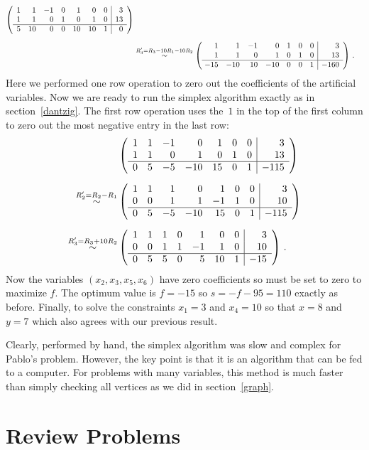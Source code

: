 \begin{example}
\begin{align*}
\left(\begin{array}{rrrrrrr|r}
1&1&-1&0&1&0&0&3\\
1&1&0&1&0&1&0&13\\\hline
5&10&\ 0&0&10&10&1&0
\end{array}\right)\\[2mm]
&\stackrel{\small R_3'=R_3-10 R_1-10R_2 }\sim
\left(\begin{array}{rrrrrrr|r}
1&1&-1&0&1&0&0&3\\
1&1&0&1&0&1&0&13\\\hline
\!-15&-10&\ 10&-10&0&0&1&-160
\end{array}\right)
\, .
\end{align*}
Here we performed one row operation to zero out the coefficients of the artificial variables.
Now we are ready to run the simplex algorithm exactly as in section~\ref{dantzig}. The first row operation 
uses the~$1$ in the top of the first column to zero out the most negative entry in the last row:
\begin{align*}&
\left(\begin{array}{rrrrrrr|r}
1&1&-1&0&1&0&0&3\\
1&1&0&1&0&1&0&13\\\hline
0&5&-5&-10&15&0&1&-115
\end{array}\right)\\[2mm]
\stackrel{\small R_2'=R_2-R_1}\sim&
\left(\begin{array}{rrrrrrr|r}
1&1&1&0&1&0&0&3\\
0&0&1&1&-1&1&0&10\\\hline
0&5&-5&-10&15&0&1&-115
\end{array}\right)\\[2mm]
\stackrel{\small R_3'=R_3+10R_2}\sim&
\left(\begin{array}{rrrrrrr|r}
1&1&1&0&1&0&0&3\\
0&0&1&1&-1&1&0&10\\\hline
0&5&5&0&5&10&1&-15
\end{array}\right)
\, .
\end{align*}
Now the variables $(x_2,x_3,x_5,x_6)$ have zero coefficients so must be set to zero to maximize $f$.
The optimum value is $f=-15$ so $s=-f-95=110$ exactly as before. Finally, to solve the constraints $x_1=3$
and $x_4=10$ so that $x=8$ and $y=7$ which also agrees with our previous result.
 \end{example}


Clearly, performed by hand,  the simplex algorithm was slow and complex for Pablo's problem. However, the key point is
that it is an algorithm that can be fed to a computer. For problems with many variables, this method is much faster than 
simply checking all vertices as we did in section~\ref{graph}.

\section{Review Problems}





